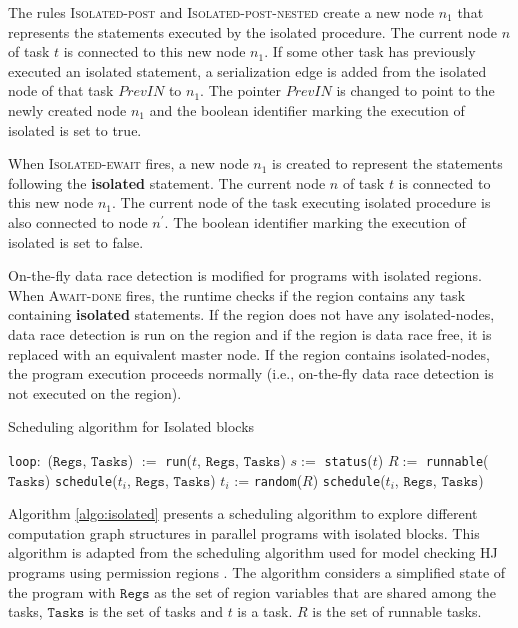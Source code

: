 The rules \textsc{Isolated-post} and \textsc{Isolated-post-nested} create a new node $n_1$ that represents the statements executed by the isolated procedure. The current node $n$ of task $t$ is connected to this new node $n_1$. If some other task has previously executed an isolated statement, a serialization edge is added from the isolated node of that task $PrevIN$ to $n_1$. The pointer $PrevIN$ is changed to point to the newly created node $n_1$ and the boolean identifier marking the execution of isolated is set to true.

When \textsc{Isolated-ewait} fires, a new node $n_1$ is created to represent the statements following the \textbf{isolated} statement. The current node $n$ of task $t$ is connected to this new node $n_1$. The current node of the task executing isolated procedure is also connected to node $n^\prime$. The boolean identifier marking the execution of isolated is set to false.

On-the-fly data race detection is modified for programs with isolated regions. When \textsc{Await-done} fires, the runtime checks if the region contains any task containing \textbf{isolated} statements. If the region does not have any isolated-nodes, data race detection is run on the region and if the region is data race free, it is replaced with an equivalent master node. If the region contains isolated-nodes, the program execution proceeds normally (i.e., on-the-fly data race detection is not executed on the region).

\begin{algorithm}
\caption{Scheduling algorithm for Isolated blocks} \label{algo:isolated}
\begin{algorithmic}[1]
  \State \texttt{loop}:\ ($\mathtt{Regs}$, $\mathtt{Tasks}$) $:=$ \texttt{run}($t$, $\mathtt{Regs}$, $\mathtt{Tasks}$)\label{loc:run}
  \State $s :=$ \texttt{status}($t$)
  \State $R :=$ \texttt{runnable}($\mathtt{Tasks}$)
  \label{loc:entry:isolated}
  \label{loc:prsched}
  \State \texttt{schedule}($t_i$, $\mathtt{Regs}$, $\mathtt{Tasks}$)
  \EndFor
  \Else
  \State $t_i$ := \texttt{random}($R$)\label{loc:rand}
  \State \texttt{schedule}($t_i$, $\mathtt{Regs}$, $\mathtt{Tasks}$)
  \EndIf
  \EndFunction
\end{algorithmic}
\end{algorithm}

Algorithm \ref{algo:isolated} presents a scheduling algorithm to explore different computation graph structures in parallel programs with isolated blocks. This algorithm is adapted from the scheduling algorithm used for model checking HJ programs using permission regions \cite{mercer2015model}. The algorithm considers a simplified state of the program with $\mathtt{Regs}$ as the set of region variables that are shared among the tasks, $\mathtt{Tasks}$ is the set of tasks and $t$ is a task. $R$ is the set of runnable tasks. 

